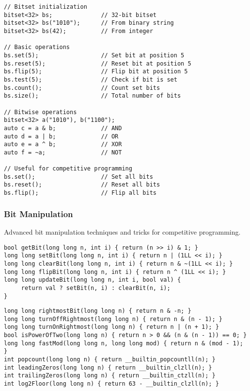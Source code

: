\documentclass[11pt,a4paper]{article}
\begin{document}
\begin{lstlisting}[caption={Bitset Operations}]
// Bitset initialization
bitset<32> bs;              // 32-bit bitset
bitset<32> bs("1010");      // From binary string
bitset<32> bs(42);          // From integer

// Basic operations
bs.set(5);                  // Set bit at position 5
bs.reset(5);                // Reset bit at position 5
bs.flip(5);                 // Flip bit at position 5
bs.test(5);                 // Check if bit is set
bs.count();                 // Count set bits
bs.size();                  // Total number of bits

// Bitwise operations
bitset<32> a("1010"), b("1100");
auto c = a & b;             // AND
auto d = a | b;             // OR
auto e = a ^ b;             // XOR
auto f = ~a;                // NOT

// Useful for competitive programming
bs.set();                   // Set all bits
bs.reset();                 // Reset all bits
bs.flip();                  // Flip all bits
\end{lstlisting}

\newpage

\subsubsection{Bit Manipulation}
Advanced bit manipulation techniques and tricks for competitive programming.

\begin{lstlisting}[caption={Basic Bit Operations}]
bool getBit(long long n, int i) { return (n >> i) & 1; }
long long setBit(long long n, int i) { return n | (1LL << i); }
long long clearBit(long long n, int i) { return n & ~(1LL << i); }
long long flipBit(long long n, int i) { return n ^ (1LL << i); }
long long updateBit(long long n, int i, bool val) {
     return val ? setBit(n, i) : clearBit(n, i); 
}
\end{lstlisting}

\begin{lstlisting}[caption={Bit Tricks}]
long long rightmostBit(long long n) { return n & -n; }
long long turnOffRightmost(long long n) { return n & (n - 1); }
long long turnOnRightmost(long long n) { return n | (n + 1); }
bool isPowerOfTwo(long long n) { return n > 0 && (n & (n - 1)) == 0; }
long long fastMod(long long n, long long mod) { return n & (mod - 1); }
int popcount(long long n) { return __builtin_popcountll(n); }
int leadingZeros(long long n) { return __builtin_clzll(n); }
int trailingZeros(long long n) { return __builtin_ctzll(n); }
int log2Floor(long long n) { return 63 - __builtin_clzll(n); }
\end{lstlisting}
\end{document}
